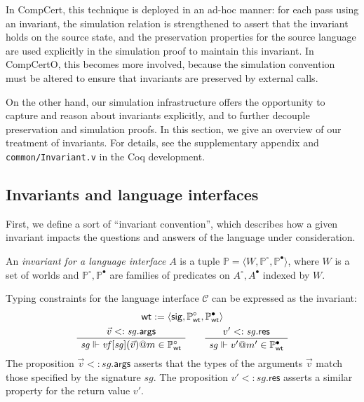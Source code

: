 \documentclass[sigplan,screen,review]{acmart}
\newcommand{\kw}[1]{\ensuremath{ \mathsf{#1} }}
\newcommand{\que}{\circ}
\newcommand{\ans}{\bullet}
\newenvironment{optional}{}{}
\begin{document}
\begin{optional}
In CompCert,
this technique is deployed in an ad-hoc manner:
for each pass using an invariant,
the simulation relation is strengthened to assert that
the invariant holds on the source state,
and the preservation properties for the source language
are used explicitly in the simulation proof
to maintain this invariant.
In CompCertO,
this becomes more involved,
because the simulation convention must be altered
to ensure that invariants are preserved
by external calls.

On the other hand,
our simulation infrastructure offers the opportunity
to capture and reason about invariants explicitly,
and to further decouple preservation and simulation proofs.
In this section,
we give an overview of our treatment of invariants.
For details,
see the supplementary appendix and
\texttt{common/Invariant.v}
in the Coq development.


\subsection{Invariants and language interfaces} %

First, we define a sort of ``invariant convention'',
which describes how a given invariant impacts the questions and answers
of the language under consideration.

\begin{definition} %
An \emph{invariant for a language interface} $A$
is a tuple
$\mathbb{P} = \langle W, \mathbb{P}^\que, \mathbb{P}^\ans \rangle$,
where $W$ is a set of worlds
and $\mathbb{P}^\que, \mathbb{P}^\ans$
are families of predicates on $A^\que, A^\ans$
indexed by $W$.
\end{definition}

\begin{example} \label{ex:wt} %
Typing constraints for the language interface $\mathcal{C}$
can be expressed as the invariant:
\begin{gather*}
  \kw{wt} :=
    \langle
      \kw{sig},
      \mathbb{P}_\kw{wt}^\que,
      \mathbb{P}_\kw{wt}^\ans
    \rangle
  \\
  \AxiomC{$\vec{v} <: \mathit{sg}.\kw{args}$}
  \UnaryInfC{$\mathit{sg} \Vdash
    \mathit{vf}[\mathit{sg}](\vec{v})@m \in \mathbb{P}_\kw{wt}^\que$}
  \DisplayProof
  \qquad
  \AxiomC{$v' <: \mathit{sg}.\kw{res}$}
  \UnaryInfC{$\mathit{sg} \Vdash
    v'@m' \in \mathbb{P}_\kw{wt}^\ans$}
  \DisplayProof
\end{gather*}
The proposition $\vec{v} <: \mathit{sg}.\kw{args}$
asserts that the types of the arguments $\vec{v}$
match those specified by the signature $\mathit{sg}$.
The proposition $v' <: \mathit{sg}.\kw{res}$
asserts a similar property for the return value $v'$.
\end{example}


\end{optional}
\end{document}
